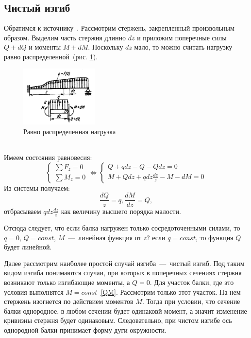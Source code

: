 \documentclass[12pt, a4paper]{article}
\begin{document}
\subsection{Чистый изгиб}
Обратимся к источнику~\cite{Feofociev}.
Рассмотрим стержень, закрепленный произвольным образом. Выделим часть стержня длинно $dz$ и приложим поперечные силы $Q + dQ$ и моменты $M + dM$. Поскольку $dz$ мало, то можно считать нагрузку равно распределенной~(рис. \ref{pic1}).
\begin{figure}[!h]
	\centering
	\includegraphics[width=0.35\textwidth]{pic.1}%
	\caption{Равно распределенная нагрузка}
	\vspace*{-2mm}
	\label{pic1}
\end{figure}
\\Имеем состояния равновесия:  
\begin{equation}
	\begin{cases}
	
	\sum\limits {{F_z = 0}} \\
	\sum\limits {{M_z = 0}}
	\end{cases}
	\Leftrightarrow
	\begin{cases}
		Q + q dz - Q - Q dz = 0 \\
		M + Q dz + q dz \frac {dz}{z} - M -dM = 0
	\end{cases}
\end{equation}
Из системы получаем:
\begin{equation}
	\label{QM}
 \frac {dQ}{z} = q, 
 \frac {dM}{dz} = Q,
\end{equation}
отбрасываем
$q dz \frac {dz}{z}$
как величину высшего порядка малости.

Отсюда следует, что если балка нагружен только сосредоточенными силами, то $q = 0$, $Q = const$, $M$~---~линейная функция от $z$? если $q = const$, то функция $Q$ будет линейной.

Далее рассмотрим наиболее простой случай изгиба~---~чистый изгиб. Под таким видом изгиба понимаются случаи, при которых в поперечных сечениях стержня возникают только изгибающие моменты, а $Q = 0$. Для участок балки, где это условия выполнятся $M = const$~\eqref{QM}. Рассмотрим только этот участок. На нем стержень изогнется по действием моментов $M$. Тогда при условии, что сечение балки однородное, в любом сечении будет одинаковй момент, а значит изменение кривизны стержня будет одинаковым. Следовательно, при чистом изгибе ось однородной балки принимает форму дуги окружности.
\end{document}
